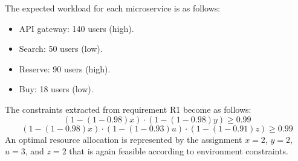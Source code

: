 \begin{enumerate}
\begin{table}[H]
\begin{tabular}{l|cc|}
            \end{tabular}
        \end{table}
        The expected workload for each microservice is as follows:
        \begin{itemize}
            \item API gateway: 140 users (high). 
            \item Search: 50 users (low).
            \item Reserve: 90 users (high).
            \item Buy: 18 users (low).
        \end{itemize}
        The constraints extracted from requirement R1 become as follows:
        \[(1 - (1 - 0.98)x) \cdot (1 - (1 - 0.98)y) \geq 0.99\]
        \[(1 - (1 - 0.98)x) \cdot (1 - (1 - 0.93)u) \cdot (1 - (1 - 0.91)z) \geq 0.99\]
        An optimal resource allocation is represented by the assignment $x = 2$, $y = 2$, $u = 3$, and $z = 2$ that is again feasible according to environment constraints.
\end{enumerate}